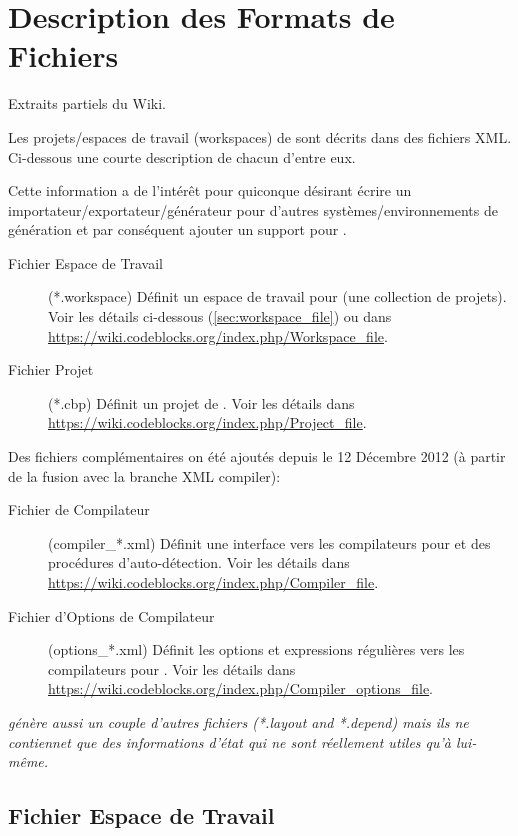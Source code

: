 \section{Description des Formats de Fichiers}\label{sec:file_formats}

Extraits partiels du Wiki.

Les projets/espaces de travail (workspaces) de \codeblocks sont décrits dans des fichiers XML. Ci-dessous une courte description de chacun d'entre eux.

Cette information a de l'intérêt pour quiconque désirant écrire un importateur/exportateur/générateur pour d'autres systèmes/environnements de génération et par conséquent ajouter un support pour \codeblocks.

\begin{description}
\item[Fichier Espace de Travail] (*.workspace) Définit un espace de travail pour \codeblocks (une collection de projets). Voir les détails ci-dessous (\ref{sec:workspace_file}) ou dans \url{https://wiki.codeblocks.org/index.php/Workspace_file}.
\item[Fichier Projet] (*.cbp) Définit un projet de \codeblocks. Voir les détails dans \url{https://wiki.codeblocks.org/index.php/Project_file}.
\end{description}

Des fichiers complémentaires on été ajoutés depuis le 12 Décembre 2012 (à partir de la fusion avec la branche XML compiler):

\begin{description}
\item[Fichier de Compilateur] (compiler\_*.xml) Définit une interface vers les compilateurs pour \codeblocks et des procédures d'auto-détection. Voir les détails dans \url{https://wiki.codeblocks.org/index.php/Compiler_file}.
\item[Fichier d'Options de Compilateur] (options\_*.xml) Définit les options et expressions régulières vers les compilateurs pour \codeblocks. Voir les détails dans \url{https://wiki.codeblocks.org/index.php/Compiler_options_file}.
\end{description}

\textit{\codeblocks génère aussi un couple d'autres fichiers (*.layout and *.depend) mais ils ne contiennet que des informations d'état qui ne sont réellement utiles qu'à \codeblocks lui-même.}

\subsection*{Fichier Espace de Travail}\label{sec:workspace_file}

